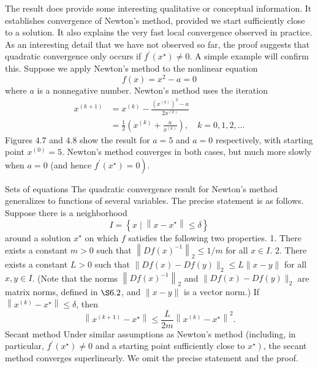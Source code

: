 The result does provide some interesting qualitative or conceptual information. It establishes convergence of Newton's method, provided we start sufficiently close to a solution. It also explains the very fast local convergence observed in practice. As an interesting detail that we have not observed so far, the proof suggests that quadratic convergence only occurs if $ f^{\prime}\left(x^{\star}\right) \neq 0 $. A simple example will confirm this.
Suppose we apply Newton's method to the nonlinear equation
\begin{equation}
f(x)=x^{2}-a=0
\end{equation}
where $ a $ is a nonnegative number. Newton's method uses the iteration
\begin{equation}
\begin{aligned}
x^{(k+1)} &=x^{(k)}-\frac{\left(x^{(k)}\right)^{2}-a}{2 x^{(k)}} \\
&=\frac{1}{2}\left(x^{(k)}+\frac{a}{x^{(k)}}\right), \quad k=0,1,2, \ldots
\end{aligned}
\end{equation}
Figures $ 4.7 $ and $ 4.8 $ show the result for $ a=5 $ and $ a=0 $ respectively, with starting point $ x^{(0)}=5 $. Newton's method converges in both cases, but much more slowly when $ a=0 $ (and hence $ \left.f^{\prime}\left(x^{\star}\right)=0\right) $.

Sets of equations The quadratic convergence result for Newton's method generalizes to functions of several variables. The precise statement is as follows. Suppose there is a neighborhood
\begin{equation}
I=\left\{x \mid\left\|x-x^{\star}\right\| \leq \delta\right\}
\end{equation}
around a solution $ x^{\star} $ on which $ f $ satisfies the following two properties.
1. There exists a constant $ m>0 $ such that $ \left\|D f(x)^{-1}\right\|_{2} \leq 1 / m $ for all $ x \in I $.
2. There exists a constant $ L>0 $ such that $ \|D f(x)-D f(y)\|_{2} \leq L\|x-y\| $ for all $ x, y \in I $.
(Note that the norms $ \left\|D f(x)^{-1}\right\|_{2} $ and $ \|D f(x)-D f(y)\|_{2} $ are matrix norms, defined in $ \S 6.2 $, and $ \|x-y\| $ is a vector norm.) If $ \left\|x^{(k)}-x^{\star}\right\| \leq \delta $, then
\begin{equation}
\left\|x^{(k+1)}-x^{\star}\right\| \leq \frac{L}{2 m}\left\|x^{(k)}-x^{\star}\right\|^{2} .
\end{equation}
Secant method Under similar assumptions as Newton's method (including, in particular, $ f^{\prime}\left(x^{\star}\right) \neq 0 $ and a starting point sufficiently close to $ \left.x^{\star}\right) $, the secant method converges superlinearly. We omit the precise statement and the proof.